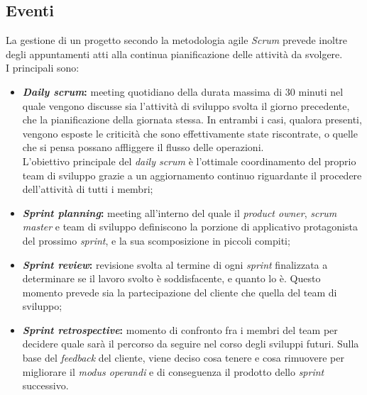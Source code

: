 \subsection{Eventi}
La gestione di un progetto secondo la metodologia agile \textit{Scrum} prevede inoltre degli appuntamenti atti alla continua pianificazione delle attività da svolgere.\\
I principali sono:
\begin{itemize}
  \item \textbf{\textit{Daily scrum}:} meeting quotidiano della durata massima di 30 minuti nel quale vengono discusse sia l'attività di sviluppo svolta il giorno precedente, che la pianificazione della giornata stessa. In entrambi i casi, qualora presenti, vengono esposte le criticità che sono effettivamente state riscontrate, o quelle che si pensa possano affliggere il flusso delle operazioni.\\
  L'obiettivo principale del \textit{daily scrum} è l'ottimale coordinamento del proprio team di sviluppo grazie a un aggiornamento continuo riguardante il procedere dell'attività di tutti i membri;
  
  \item \textbf{\textit{Sprint planning}:} meeting all'interno del quale il \textit{product owner}, \textit{scrum master} e team di sviluppo definiscono la porzione di applicativo protagonista del prossimo \textit{sprint}, e la sua scomposizione in piccoli compiti;
  
  \item \textbf{\textit{Sprint review}:} revisione svolta al termine di ogni \textit{sprint} finalizzata a determinare se il lavoro svolto è soddisfacente, e quanto lo è. Questo momento prevede sia la partecipazione del cliente che quella del team di sviluppo;
  
  \item \textbf{\textit{Sprint retrospective}:} momento di confronto fra i membri del team per decidere quale sarà il percorso da seguire nel corso degli sviluppi futuri. Sulla base del \textit{feedback} del cliente, viene deciso cosa tenere e cosa rimuovere per migliorare il \textit{modus operandi} e di conseguenza il prodotto dello \textit{sprint} successivo.
\end{itemize}

